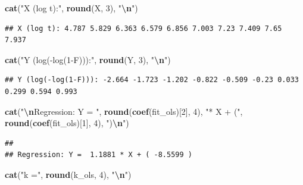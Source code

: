 \documentclass[
]{article}
\newenvironment{Shaded}{\begin{snugshade}}{\end{snugshade}}
\newcommand{\DecValTok}[1]{\textcolor[rgb]{0.00,0.00,0.81}{#1}}
\newcommand{\FunctionTok}[1]{\textcolor[rgb]{0.13,0.29,0.53}{\textbf{#1}}}
\newcommand{\NormalTok}[1]{#1}
\newcommand{\SpecialCharTok}[1]{\textcolor[rgb]{0.81,0.36,0.00}{\textbf{#1}}}
\newcommand{\StringTok}[1]{\textcolor[rgb]{0.31,0.60,0.02}{#1}}
\begin{document}
\begin{Shaded}
\begin{Highlighting}[]
\FunctionTok{cat}\NormalTok{(}\StringTok{"X (log t):"}\NormalTok{, }\FunctionTok{round}\NormalTok{(X, }\DecValTok{3}\NormalTok{), }\StringTok{"}\SpecialCharTok{\textbackslash{}n}\StringTok{"}\NormalTok{)}
\end{Highlighting}
\end{Shaded}

\begin{verbatim}
## X (log t): 4.787 5.829 6.363 6.579 6.856 7.003 7.23 7.409 7.65 7.937
\end{verbatim}

\begin{Shaded}
\begin{Highlighting}[]
\FunctionTok{cat}\NormalTok{(}\StringTok{"Y (log({-}log(1{-}F))):"}\NormalTok{, }\FunctionTok{round}\NormalTok{(Y, }\DecValTok{3}\NormalTok{), }\StringTok{"}\SpecialCharTok{\textbackslash{}n}\StringTok{"}\NormalTok{)}
\end{Highlighting}
\end{Shaded}

\begin{verbatim}
## Y (log(-log(1-F))): -2.664 -1.723 -1.202 -0.822 -0.509 -0.23 0.033 0.299 0.594 0.993
\end{verbatim}

\begin{Shaded}
\begin{Highlighting}[]
\FunctionTok{cat}\NormalTok{(}\StringTok{"}\SpecialCharTok{\textbackslash{}n}\StringTok{Regression: Y = "}\NormalTok{, }\FunctionTok{round}\NormalTok{(}\FunctionTok{coef}\NormalTok{(fit\_ols)[}\DecValTok{2}\NormalTok{], }\DecValTok{4}\NormalTok{), }\StringTok{"* X + ("}\NormalTok{,}
    \FunctionTok{round}\NormalTok{(}\FunctionTok{coef}\NormalTok{(fit\_ols)[}\DecValTok{1}\NormalTok{], }\DecValTok{4}\NormalTok{), }\StringTok{")}\SpecialCharTok{\textbackslash{}n}\StringTok{"}\NormalTok{)}
\end{Highlighting}
\end{Shaded}

\begin{verbatim}
## 
## Regression: Y =  1.1881 * X + ( -8.5599 )
\end{verbatim}

\begin{Shaded}
\begin{Highlighting}[]
\FunctionTok{cat}\NormalTok{(}\StringTok{"k ="}\NormalTok{, }\FunctionTok{round}\NormalTok{(k\_ols, }\DecValTok{4}\NormalTok{), }\StringTok{"}\SpecialCharTok{\textbackslash{}n}\StringTok{"}\NormalTok{)}
\end{Highlighting}
\end{Shaded}
\end{document}
